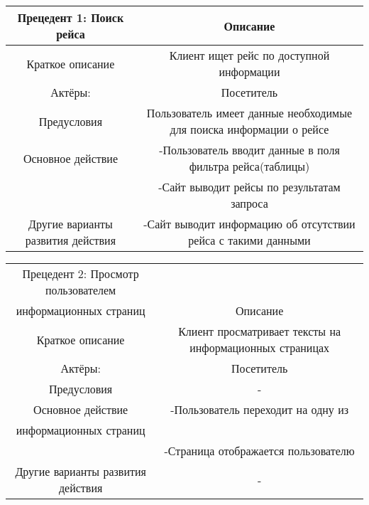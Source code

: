 \begin{table}[h]
    \begin{tabular}{|c|c|}
    \hline
    Прецедент 1: Поиск рейса          & Описание                                                                                              \\ \hline
    Краткое описание                  & Клиент ищет рейс по доступной информации                                                              \\ \hline
    Актёры:                           & Посетитель                                                                                            \\ \hline
    Предусловия                       & Пользователь имеет данные необходимые для поиска информации о рейсе                                   \\ \hline
    Основное действие                 & -Пользователь вводит данные в поля фильтра рейса(таблицы)\\ &-Сайт выводит рейсы по результатам запроса \\ \hline
    Другие варианты развития действия & -Сайт выводит информацию об отсутствии рейса с такими данными                                         \\ \hline
    \end{tabular}
\end{table}

\begin{table}[h]
    \begin{tabular}{|c|c|}
    \hline
    Прецедент 2: Просмотр пользователем\\ информационных страниц          & Описание                                                                                              \\ \hline
    Краткое описание                  & Клиент просматривает тексты на информационных страницах                                                            \\ \hline
    Актёры:                           & Посетитель                                                                                            \\ \hline
    Предусловия                       & -                                   \\ \hline
    Основное действие                 & -Пользователь переходит на одну из\\ информационных страниц\\ &-Страница отображается пользователю \\ \hline
    Другие варианты развития действия & -                                        \\ \hline
    \end{tabular}
\end{table}

